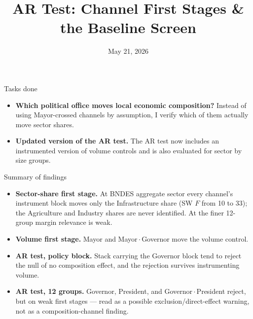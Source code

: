 \documentclass[aspectratio=169,11pt]{beamer}
\title{\textbf{AR Test: Channel First Stages \& the Baseline Screen}}
\date{May 21, 2026}
\begin{document}
\begin{frame}
\titlepage
\end{frame}

\begin{frame}{Tasks done}
\begin{itemize}\setlength{\itemsep}{1.2em}
\item \textbf{Which political office moves local economic composition?}
      Instead of using Mayor-crossed channels by assumption, I verify which of them actually move sector shares.
\item \textbf{Updated version of the AR test.}
      The AR test now includes an instrumented version of volume controls and is also evaluated for sector by size groups.
\end{itemize}
\end{frame}

\begin{frame}{Summary of findings}
\begin{itemize}\setlength{\itemsep}{0.7em}
\item \textbf{Sector-share first stage.} At BNDES aggregate sector every channel's instrument block moves only the Infrastructure share (SW $F$ from 10 to 33); the Agriculture and Industry shares are never identified. At the finer 12-group margin relevance is weak.
\item \textbf{Volume first stage.} Mayor and Mayor\,$\cdot$\,Governor move the volume control.
\item \textbf{AR test, policy block.} Stack carrying the Governor block tend to reject the null of no composition effect, and the rejection survives instrumenting volume.
\item \textbf{AR test, 12 groups.} Governor, President, and Governor\,$\cdot$\,President reject, but on weak first stages --- read as a possible exclusion/direct-effect warning, not as a composition-channel finding.
\end{itemize}
\end{frame}
\end{document}
